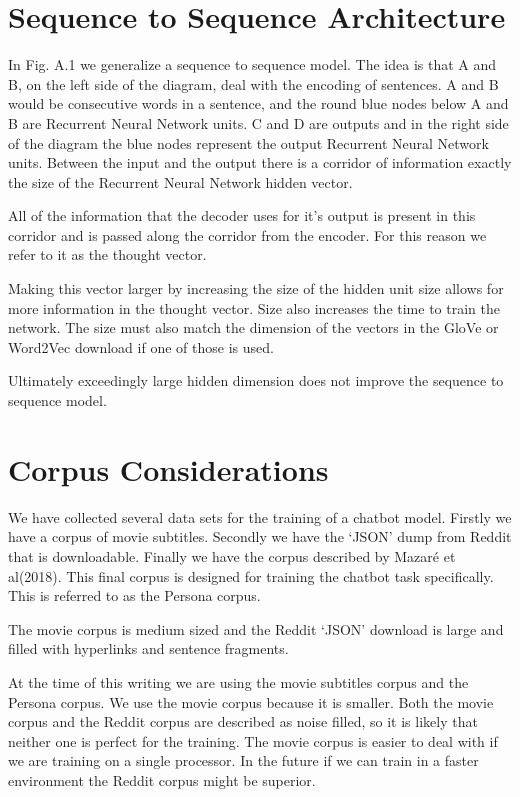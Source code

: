 \section{Sequence to Sequence Architecture}

In Fig. A.1 we generalize a sequence to sequence model. The idea is that A and B, on the left side of the diagram, deal with the encoding of sentences. A and B would be consecutive words in a sentence, and the round blue nodes below A and B are Recurrent Neural Network units. C and D are outputs and in the right side of the diagram the blue nodes represent the output Recurrent Neural Network units. Between the input and the output there is a corridor of information exactly the size of the Recurrent Neural Network hidden vector. 

All of the information that the decoder uses for it\textquoteright s output is present in this corridor and is passed along the corridor from the encoder. For this reason we refer to it as the thought vector.

Making this vector larger by increasing the size of the hidden unit size allows for more information in the thought vector. Size also increases the time to train the network. The size must also match the dimension of the vectors in the GloVe or Word2Vec download if
one of those is used. 

Ultimately exceedingly large hidden dimension does not improve the sequence to sequence model. 



\section{Corpus Considerations}
We have collected several data sets for the training of a chatbot model. Firstly we have a corpus of movie subtitles. Secondly we have the `JSON' dump from Reddit that is downloadable. Finally we have the corpus described by Mazar{\'{e}} et al(2018)\cite{DBLP:journals/corr/abs-1809-01984}. This final corpus is designed for training the chatbot task specifically. This is referred to as the Persona corpus.

The movie corpus is medium sized and the Reddit `JSON' download is large
and filled with hyperlinks and sentence fragments. 

At the time of
this writing we are using the movie subtitles corpus and the Persona corpus. We use the movie
corpus because it is smaller. Both the movie corpus and the Reddit
corpus are described as noise filled, so it is likely that neither
one is perfect for the training. The movie corpus is easier to deal
with if we are training on a single processor. In the future if we
can train in a faster environment the Reddit corpus might be superior.

